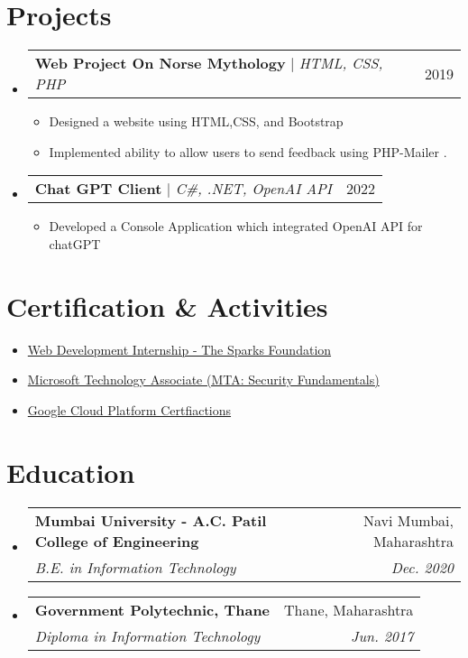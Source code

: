\documentclass[letterpaper,11pt]{article}
\makeatletter
\newcommand{\resumeItem}[1]{
  \item\small{
    {#1 \vspace{-2pt}}
  }
}
\newcommand{\resumeSubheading}[4]{
  \vspace{-2pt}\item
    \begin{tabular*}{0.97\textwidth}[t]{l@{\extracolsep{\fill}}r}
      \textbf{#1} & #2 \\
      \textit{\small#3} & \textit{\small #4} \\
    \end{tabular*}\vspace{-7pt}
}
\newcommand{\resumeProjectHeading}[2]{
    \item
    \begin{tabular*}{0.97\textwidth}{l@{\extracolsep{\fill}}r}
      \small#1 & #2 \\
    \end{tabular*}\vspace{-7pt}
}
\newcommand{\resumeSubHeadingListStart}{\begin{itemize}[leftmargin=0.15in, label={}]}
\newcommand{\resumeSubHeadingListEnd}{\end{itemize}}
\newcommand{\resumeItemListStart}{\begin{itemize}}
\newcommand{\resumeItemListEnd}{\end{itemize}\vspace{-5pt}}
\makeatother
\begin{document}
\section{Projects}
    \resumeSubHeadingListStart
      \resumeProjectHeading
          {\textbf{Web Project On Norse Mythology} $|$ \emph{HTML, CSS, PHP}}{2019}
          \resumeItemListStart
            \resumeItem{Designed a website using HTML,CSS, and Bootstrap}
            \resumeItem{Implemented ability to allow users to send feedback using PHP-Mailer .}
          \resumeItemListEnd
      \resumeProjectHeading
          {\textbf{Chat GPT Client } $|$ \emph{C\#, .NET, OpenAI API}}{2022}
          \resumeItemListStart
            \resumeItem{Developed a Console Application which integrated OpenAI API for chatGPT }
          \resumeItemListEnd
    \resumeSubHeadingListEnd
\section{Certification & Activities}
    \resumeItemListStart
        \resumeItem{\href{https://drive.google.com/file/d/1Lpkbt5iVnXtadE8H2wnr1fBPywnXntYY/view?usp=sharing}{Web Development Internship - The Sparks Foundation}}
        \resumeItem{\href{https://www.youracclaim.com/badges/4a36f993-4157-4684-b65b-b9fb2c14d9bb}{Microsoft Technology Associate (MTA: Security Fundamentals)}}
        \resumeItem{\href{https://www.cloudskillsboost.google/public_profiles/d451f106-d88a-4502-87c2-182a85196922}{Google Cloud Platform Certfiactions}}
        
    \resumeItemListEnd


\section{Education}
  \resumeSubHeadingListStart
    \resumeSubheading
      {Mumbai University  - A.C. Patil College of Engineering}{Navi Mumbai, Maharashtra}
      {B.E. in Information Technology }{Dec. 2020}
    \resumeSubheading
      {Government Polytechnic, Thane }{Thane, Maharashtra}
      {Diploma in Information Technology}{Jun. 2017}
  \resumeSubHeadingListEnd


\end{document}
